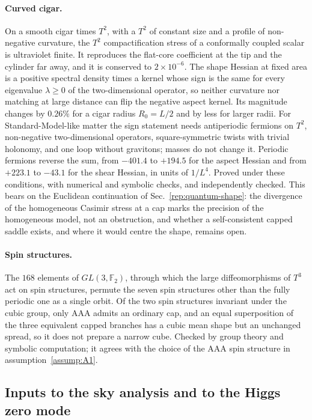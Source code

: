 \paragraph{Curved cigar.}
On a smooth cigar times $T^2$, with a $T^2$ of constant size and a profile of non-negative curvature, the $T^2$ compactification stress of a conformally coupled scalar is ultraviolet finite. %
It reproduces the flat-core coefficient at the tip and the cylinder far away, and it is conserved to $2\times10^{-6}$. %
The shape Hessian at fixed area is a positive spectral density times a kernel whose sign is the same for every eigenvalue $\lambda\ge0$ of the two-dimensional operator, so neither curvature nor matching at large distance can flip the negative aspect kernel.
Its magnitude changes by $0.26\%$ for a cigar radius $R_0=L/2$ and by less for larger radii. %
For Standard-Model-like matter the sign statement needs antiperiodic fermions on $T^2$, non-negative two-dimensional operators, square-symmetric twists with trivial holonomy, and one loop without gravitons; masses do not change it.
Periodic fermions reverse the sum, from $-401.4$ to $+194.5$ for the aspect Hessian and from $+223.1$ to $-43.1$ for the shear Hessian, in units of $1/L^4$. %
Proved under these conditions, with numerical and symbolic checks, and independently checked.
This bears on the Euclidean continuation of Sec.~\ref{rep:quantum-shape}: the divergence of the homogeneous Casimir stress at a cap marks the precision of the homogeneous model, not an obstruction, and whether a self-consistent capped saddle exists, and where it would centre the shape, remains open.

\paragraph{Spin structures.}
The $168$ elements of $GL(3,\mathbb F_2)$, through which the large diffeomorphisms of $T^3$ act on spin structures, permute the seven spin structures other than the fully periodic one as a single orbit. %
Of the two spin structures invariant under the cubic group, only AAA admits an ordinary cap, and an equal superposition of the three equivalent capped branches has a cubic mean shape but an unchanged spread, so it does not prepare a narrow cube.
Checked by group theory and symbolic computation; it agrees with the choice of the AAA spin structure in assumption~\ref{assump:A1}.

\subsection{Inputs to the sky analysis and to the Higgs zero mode}\label{sec:v21-inputs}

